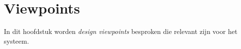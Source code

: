 \chapter{Viewpoints}
\label{chap:viewpoints}

In dit hoofdstuk worden \emph{design viewpoints} besproken die relevant zijn voor het systeem. 




